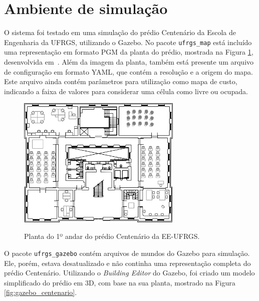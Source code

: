 \documentclass[repeatfields,xlists,xpacks,oneside,yearsonly]{ufrgscca}
\begin{document}
\section{Ambiente de simulação}

O sistema foi testado em uma simulação do prédio Centenário da Escola
de Engenharia da UFRGS, utilizando o Gazebo. No pacote
\texttt{ufrgs\_map} está incluído uma representação em formato PGM da
planta do prédio, mostrada na Figura \ref{fig:planta_centenario},
desenvolvida em~\textcite{petry_tcc}. Além da imagem da planta,
também está presente um arquivo de configuração em formato YAML, que
contém a resolução e a origem do mapa. Este arquivo ainda contém
parâmetros para utilização como mapa de custo, indicando a faixa de
valores para considerar uma célula como livre ou ocupada.

\begin{figure}[H]
    {
        \centering
        \caption{Planta do 1º andar do prédio Centenário da EE-UFRGS.}
        \label{fig:planta_centenario}
        \includegraphics[width=0.7\textwidth]{centenario_floor_plan.png}\\
    }
    {}
\end{figure}

O pacote \texttt{ufrgs\_gazebo} contém arquivos de mundos do Gazebo
para simulação. Ele, porém, estava desatualizado e não continha uma
representação completa do prédio Centenário. Utilizando o
\textit{Building Editor} do Gazebo, foi criado um modelo simplificado
do prédio em 3D, com base na sua planta, mostrado na Figura
\ref{fig:gazebo_centenario}.
\end{document}
